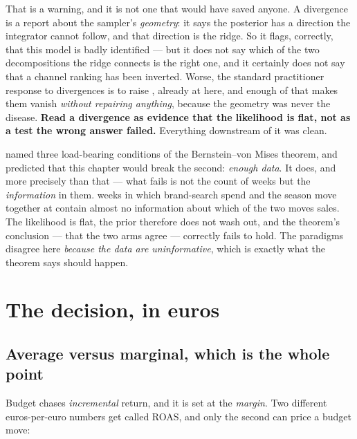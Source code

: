 That is a warning, and it is not one that would have saved anyone. A divergence is a report about
the sampler's \emph{geometry}: it says the posterior has a direction the integrator cannot follow,
and that direction is the ridge. So it flags, correctly, that this model is badly identified --- but
it does not say which of the two decompositions the ridge connects is the right one, and it
certainly does not say that a channel ranking has been inverted. Worse, the standard practitioner
response to divergences is to raise , already at \nbSixTargetAccept{} here, and
enough of that makes them vanish \emph{without repairing anything}, because the geometry was never
the disease. \textbf{Read a divergence as evidence that the likelihood is flat, not as a test the
wrong answer failed.} Everything downstream of it was clean.

\begin{remark}
 named three load-bearing conditions of the Bernstein--von Mises theorem, and
predicted that this chapter would break the second: \emph{enough data}. It does, and more
precisely than that --- what fails is not the count of weeks but the \emph{information} in them.
\nbSixNWeeks{} weeks in which brand-search spend and the season move together at
\nbSixCorrBsSeason{} contain almost no information about which of the two moves sales. The
likelihood is flat, the prior therefore does not wash out, and the theorem's conclusion --- that
the two arms agree --- correctly fails to hold. The paradigms disagree here \emph{because the
data are uninformative}, which is exactly what the theorem says should happen.
\end{remark}

\section{The decision, in euros}
\label{sec:mmm:euro}

\subsection*{Average versus marginal, which is the whole point}

Budget chases \emph{incremental} return, and it is set at the \emph{margin}. Two different
euros-per-euro numbers get called ROAS, and only the second can price a budget move:

